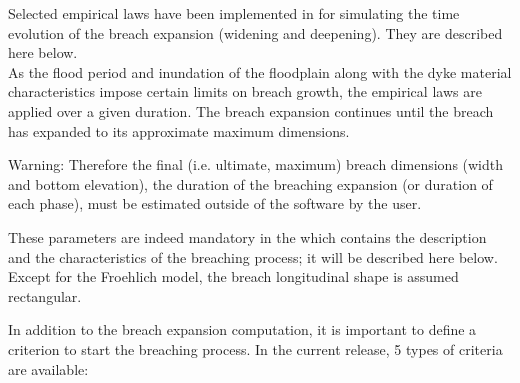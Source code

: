 Selected empirical laws have been implemented in  for simulating
the time evolution of the breach expansion (widening and deepening). They are
described here below. \\
As the flood period and inundation of the floodplain along with the dyke material
characteristics impose certain limits on breach growth, the empirical laws are
applied over a given duration.
The breach expansion continues until the breach
has expanded to its approximate maximum dimensions.

\begin{WarningBlock}{Warning:}
Therefore the final
(i.e. ultimate, maximum) breach
dimensions (width and bottom elevation), the duration of the breaching expansion
(or duration of each phase), must be estimated outside
of the \tel software by the user.
\end{WarningBlock}

These parameters are indeed mandatory
in the
 which contains the description and the
characteristics of
the breaching process; it will be described here below.
Except for the Froehlich model, the breach longitudinal shape is assumed
rectangular.

In addition to the breach expansion computation, it is important to define a
criterion to start
the breaching process. In the current release, 5 types of criteria are
available:

